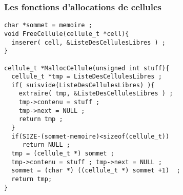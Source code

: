 \begin{frame}[fragile]
  \frametitle{Les fonctions d'allocations de cellules}%
\begin{verbatim}
char *sommet = memoire ;
void FreeCellule(cellule_t *cell){
  inserer( cell, &ListeDesCellulesLibres ) ;
} 

cellule_t *MallocCellule(unsigned int stuff){
  cellule_t *tmp = ListeDesCellulesLibres ;
  if( suisvide(ListeDesCellulesLibres) ){
    extraire( tmp, &ListeDesCellulesLibres ) ;
    tmp->contenu = stuff ; 
    tmp->next = NULL ;
    return tmp ; 
  }
  if(SIZE-(sommet-memoire)<sizeof(cellule_t))
     return NULL ;
  tmp = (cellule_t *) sommet ;
  tmp->contenu = stuff ; tmp->next = NULL ; 
  sommet = (char *) ((cellule_t *) sommet +1)  ;
  return tmp;
}
\end{verbatim}
\end{frame}
